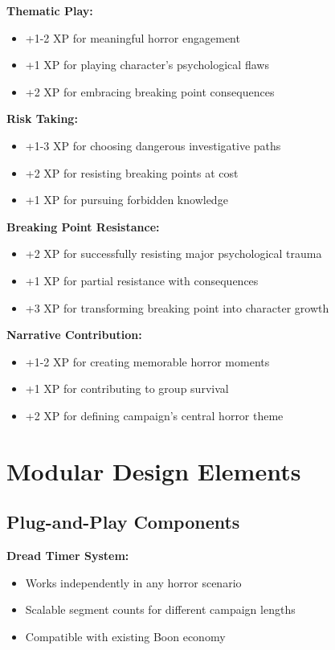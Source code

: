 \documentclass[11pt]{article}
\begin{document}
\textbf{Thematic Play:}
\begin{itemize}
\item +1-2 XP for meaningful horror engagement
\item +1 XP for playing character's psychological flaws
\item +2 XP for embracing breaking point consequences
\end{itemize}

\textbf{Risk Taking:}
\begin{itemize}
\item +1-3 XP for choosing dangerous investigative paths
\item +2 XP for resisting breaking points at cost
\item +1 XP for pursuing forbidden knowledge
\end{itemize}

\textbf{Breaking Point Resistance:}
\begin{itemize}
\item +2 XP for successfully resisting major psychological trauma
\item +1 XP for partial resistance with consequences
\item +3 XP for transforming breaking point into character growth
\end{itemize}

\textbf{Narrative Contribution:}
\begin{itemize}
\item +1-2 XP for creating memorable horror moments
\item +1 XP for contributing to group survival
\item +2 XP for defining campaign's central horror theme
\end{itemize}

\section{Modular Design Elements}

\subsection{Plug-and-Play Components}

\textbf{Dread Timer System:}
\begin{itemize}
\item Works independently in any horror scenario
\item Scalable segment counts for different campaign lengths
\item Compatible with existing Boon economy
\end{itemize}
\end{document}
